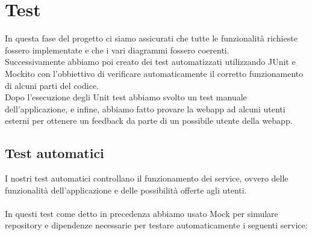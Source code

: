 \documentclass{report}
\begin{document}
\chapter{Test}
In questa fase del progetto ci siamo assicurati che tutte le funzionalità 
richieste fossero implementate e che i vari diagrammi fossero coerenti. \\
Successivamente abbiamo poi creato dei test automatizzati utilizzando JUnit
e Mockito con l'obbiettivo di verificare automaticamente il corretto
funzionamento di alcuni parti del codice. \\
Dopo l'esecuzione degli Unit test abbiamo svolto un test manuale dell'applicazione,
e infine, abbiamo fatto provare la webapp ad alcuni utenti esterni per ottenere un 
feedback da parte di un possibile utente della webapp.
\\
\section{Test automatici}
I nostri test automatici controllano il funzionamento dei service, ovvero
delle funzionalità dell'applicazione e delle possibilità offerte agli utenti.
\\ \\
In questi test come detto in precedenza abbiamo usato Mock per simulare repository
e dipendenze necessarie per testare automaticamente i seguenti service:
\end{document}
